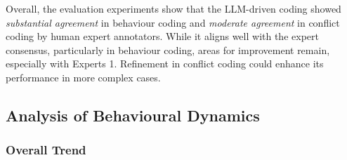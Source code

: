 
Overall, the evaluation experiments show that the LLM-driven coding showed \textit{substantial agreement} in behaviour coding and \textit{moderate agreement} in conflict coding by human expert annotators. While it aligns well with the expert consensus, particularly in behaviour coding, areas for improvement remain, especially with Experts 1. Refinement in conflict coding could enhance its performance in more complex cases.




\subsection{Analysis of Behavioural Dynamics}

\subsubsection{Overall Trend}

